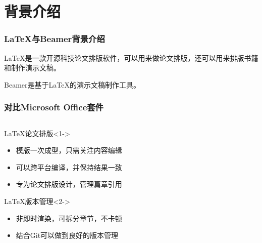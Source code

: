 \section[背景介绍]{背景介绍}
\begin{frame}
    \frametitle{\LaTeX 与Beamer背景介绍}
    \par
    LaTeX是一款开源科技论文排版软件，可以用来做论文排版，还可以用来排版书籍和制作演示文稿。
    \newline
    \par
    Beamer是基于LaTeX的演示文稿制作工具。
\end{frame}

\begin{frame}
    \frametitle{对比Microsoft Office套件}
    \begin{columns}
        \begin{column}{0.94\textwidth}
            \begin{block}{\LaTeX 论文排版}<1->
                \begin{itemize}
                    \item 模版一次成型，只需关注内容编辑
                    \item 可以跨平台编译，并保持结果一致
                    \item 专为论文排版设计，管理篇章引用
                \end{itemize}
            \end{block}
            \begin{block}{\LaTeX 版本管理}<2->
                \begin{itemize}
                    \item 非即时渲染，可拆分章节，不卡顿
                    \item 结合Git可以做到良好的版本管理
                \end{itemize}
            \end{block}
        \end{column}
        \begin{column}{0.06\textwidth}
        \end{column}
    \end{columns}
\end{frame}

